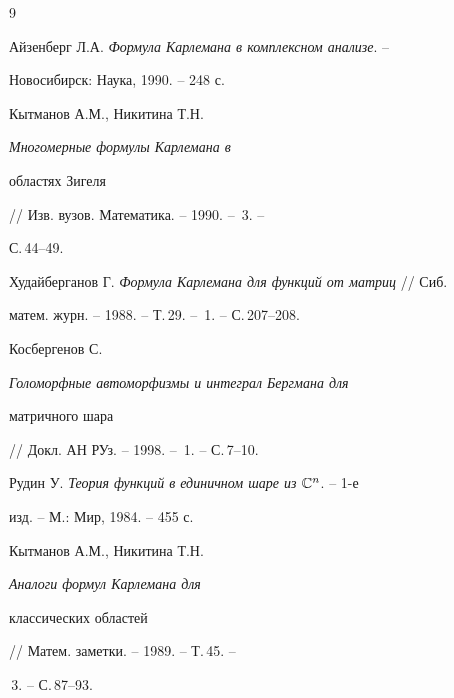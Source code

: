  


 


\begin{thebibliography}{9} 


 




Айзенберг Л.А. {\em Формула Карлемана в комплексном анализе}. -- 


Новосибирск: Наука, 1990. -- 248 с. 




Кытманов А.М., Никитина Т.Н. {\em Многомерные формулы Карлемана в 


областях Зигеля} // Изв. вузов. Математика. -- 1990. -- \No\,3. -- 


С.\,44--49. 




Худайберганов Г. {\em Формула Карлемана для функций от матриц} // Сиб. 


матем. журн. -- 1988. -- Т.\,29. -- \No\,1. -- С.\,207--208. 




Косбергенов С. {\em Голоморфные автоморфизмы и интеграл Бергмана для 


матричного шара} // Докл. АН РУз. -- 1998. -- \No\,1. -- С.\,7--10. 




Рудин У. {\em Теория функций в единичном шаре из $\Bbb C^n$}. -- 1-е 


изд. -- М.: Мир, 1984. -- 455 с. 




Кытманов А.М., Никитина Т.Н. {\em Аналоги формул Карлемана для 


классических областей} // Матем. заметки. -- 1989. -- Т.\,45. -- 


\No\,3. -- С.\,87--93. 


 


\end{thebibliography} 


 


\vskip 0.5cm 


 






 


\label{end} 


 


